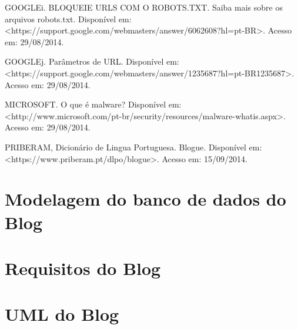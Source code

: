 \documentclass[
	12pt,				%
	openright,			%
	twoside,			%
	a4paper,			%
	english,			%
	french,				%
	spanish,			%
	brazil				%
	]{abntex2}
\begin{document}
GOOGLEi. BLOQUEIE URLS COM O ROBOTS.TXT. Saiba mais sobre os arquivos robots.txt. Disponível em: <https://support.google.com/webmasters/answer/6062608?hl=pt-BR>. Acesso em: 29/08/2014.

GOOGLEj. Parâmetros de URL. Disponível em: <https://support.google.com/webmasters/answer/1235687?hl=pt-BR1235687>. Acesso em: 29/08/2014.

MICROSOFT. O que é malware? Disponível em: <http://www.microsoft.com/pt-br/security/resources/malware-whatis.aspx>. Acesso em: 29/08/2014.

PRIBERAM, Dicionário de Lingua Portuguesa. Blogue. Disponível em: <https://www.priberam.pt/dlpo/blogue>. Acesso em: 15/09/2014.


%
%



\begin{anexosenv}

\partanexos

\chapter{Modelagem do banco de dados do Blog}

\chapter{Requisitos do Blog}

\chapter{UML do Blog}

\end{anexosenv}

\printindex
\end{document}
